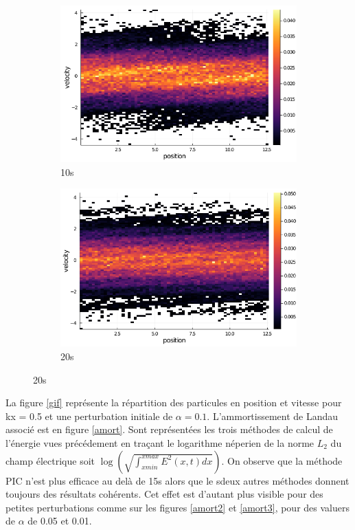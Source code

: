 \documentclass[a4paper,11pt]{article}
\begin{document}
\begin{figure}[!h]
\begin{subfigure}{0.5\textwidth}
	\centering
	\caption{10s}
	\includegraphics[width = \linewidth]{fig/kx=0.5, alpha=0.1, it=50.png}
\end{subfigure}
\begin{subfigure}{0.5\textwidth}
	\centering
	\caption{20s}
	\includegraphics[width = \linewidth]{fig/kx=0.5, alpha=0.1, it=100.png}
\end{subfigure}
\end{figure}

La figure \ref{gif} représente la répartition des particules en position et vitesse pour kx = 0.5 et une perturbation initiale de $\alpha = 0.1$. L'ammortissement de Landau associé est en figure \ref{amort}. Sont représentées les trois méthodes de calcul de l'énergie vues précédement en traçant le logarithme néperien de la norme $L_2$ du champ électrique soit $\log(\sqrt{\int_{xmin}^{xmax} E^2(x,t) dx})$. On observe que la méthode PIC n'est plus efficace au delà de 15s alors que le sdeux autres méthodes donnent toujours des résultats cohérents. Cet effet est d'autant plus visible pour des petites perturbations comme sur les figures \ref{amort2} et \ref{amort3}, pour des valuers de $\alpha$ de 0.05 et 0.01.
\end{document}
